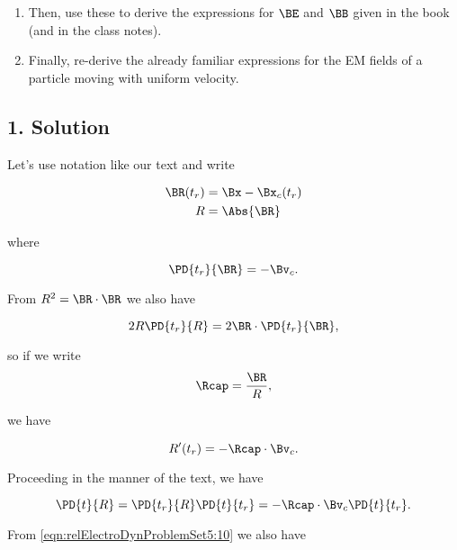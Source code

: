 \begin{enumerate}
\item Then, use these to derive the expressions for $\BE$ and $\BB$ given in the book (and in the class notes).
\item Finally, re-derive the already familiar expressions for the EM fields of a particle moving with uniform velocity.
\end{enumerate}

\subsection{1. Solution}

Let's use notation like our text \cite{landau1980classical} and write

\begin{align}\label{eqn:relativisticElectrodynamicsT4:70}
\BR(t_r) &= \Bx - \Bx_c(t_r) \\
R &= \Abs{\BR}
\end{align}

where

\begin{equation}\label{eqn:relativisticElectrodynamicsT4:90}
\PD{t_r}{\BR} = - \Bv_c.
\end{equation}

From $R^2 = \BR \cdot \BR$ we also have

\begin{equation}\label{eqn:relativisticElectrodynamicsT4:110}
2 R \PD{t_r}{R} = 2 \BR \cdot \PD{t_r}{\BR},
\end{equation}

so if we write
\begin{equation}\label{eqn:relativisticElectrodynamicsT4:130}
\Rcap = \frac{\BR}{R},
\end{equation}

we have

\begin{equation}\label{eqn:relativisticElectrodynamicsT4:150}
R'(t_r) = -\Rcap \cdot \Bv_c.
\end{equation}

Proceeding in the manner of the text, we have

\begin{equation}\label{eqn:relativisticElectrodynamicsT4:170}
\PD{t}{R} = \PD{t_r}{R} \PD{t}{t_r} = -\Rcap \cdot \Bv_c \PD{t}{t_r}.
\end{equation}

From \ref{eqn:relElectroDynProblemSet5:10} we also have

